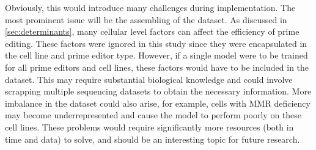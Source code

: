 Obviously, this would introduce many challenges during implementation. The most prominent issue will be the assembling of the dataset. As discussed in \autoref{sec:determinants}, many cellular level factors can affect the efficiency of prime editing. These factors were ignored in this study since they were encapsulated in the cell line and prime editor type. However, if a single model were to be trained for all prime editors and cell lines, these factors would have to be included in the dataset. This may require substantial biological knowledge and could involve scrapping multiple sequencing datasets to obtain the necessary information. 
More imbalance in the dataset could also arise, for example, cells with MMR deficiency may become underrepresented and cause the model to perform poorly on these cell lines. 
These problems would require significantly more resources (both in time and data) to solve, and should be an interesting topic for future research.